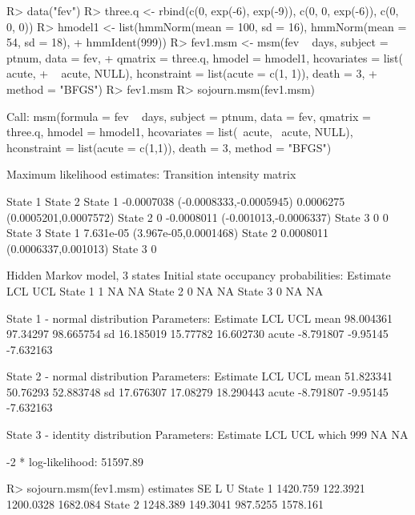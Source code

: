 \documentclass[article,shortnames]{jss}
\begin{document}
\begin{CodeChunk}
  \begin{CodeInput}
R> data("fev")
R> three.q <- rbind(c(0, exp(-6), exp(-9)), c(0, 0, exp(-6)), c(0, 0, 0))
R> hmodel1 <- list(hmmNorm(mean = 100, sd = 16), hmmNorm(mean = 54, sd = 18),
+    hmmIdent(999))
R> fev1.msm <- msm(fev ~ days, subject = ptnum, data = fev,
+    qmatrix = three.q, hmodel = hmodel1, hcovariates = list(~ acute,
+    ~ acute, NULL), hconstraint = list(acute = c(1, 1)), death = 3,
+    method = "BFGS")
R> fev1.msm
R> sojourn.msm(fev1.msm)
  \end{CodeInput}
  \begin{CodeOutput}
Call:
msm(formula = fev ~ days, subject = ptnum, data = fev, qmatrix = three.q,
    hmodel = hmodel1, hcovariates = list(~acute, ~acute, NULL),
    hconstraint = list(acute = c(1,1)), death = 3, method = "BFGS")

Maximum likelihood estimates:
Transition intensity matrix

        State 1                            State 2
State 1 -0.0007038 (-0.0008333,-0.0005945) 0.0006275 (0.0005201,0.0007572)
State 2 0                                  -0.0008011 (-0.001013,-0.0006337)
State 3 0                                  0
        State 3
State 1 7.631e-05 (3.967e-05,0.0001468)
State 2 0.0008011 (0.0006337,0.001013)
State 3 0

Hidden Markov model, 3 states
Initial state occupancy probabilities:
        Estimate LCL UCL
State 1        1  NA  NA
State 2        0  NA  NA
State 3        0  NA  NA

State 1 - normal distribution
Parameters:
       Estimate       LCL       UCL
mean  98.004361 97.34297 98.665754
sd    16.185019 15.77782 16.602730
acute -8.791807 -9.95145 -7.632163

State 2 - normal distribution
Parameters:
       Estimate       LCL       UCL
mean  51.823341 50.76293 52.883748
sd    17.676307 17.08279 18.290443
acute -8.791807 -9.95145 -7.632163

State 3 - identity distribution
Parameters:
      Estimate LCL UCL
which      999  NA  NA

-2 * log-likelihood:  51597.89

R>  sojourn.msm(fev1.msm)
        estimates       SE         L        U
State 1  1420.759 122.3921 1200.0328 1682.084
State 2  1248.389 149.3041  987.5255 1578.161
  \end{CodeOutput}
\end{CodeChunk}
\end{document}
